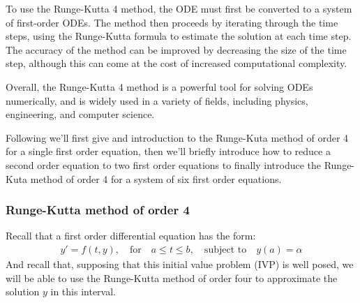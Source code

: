 \documentclass[12pt,twoside]{extarticle}
\begin{document}
To use the Runge-Kutta 4 method, the ODE must first be converted to a system of first-order ODEs. The method then proceeds by iterating through the time steps, using the Runge-Kutta formula to estimate the solution at each time step. The accuracy of the method can be improved by decreasing the size of the time step, although this can come at the cost of increased computational complexity.

Overall, the Runge-Kutta 4 method is a powerful tool for solving ODEs numerically, and is widely used in a variety of fields, including physics, engineering, and computer science.

Following \cite[Chapter 5 Initial-Value Problems for Ordinary Differential Equations, p. 259]{burden} we'll first give and introduction to the Runge-Kuta method of order 4 for a single first order equation, then we'll briefly introduce how to reduce a second order equation to two first order equations to finally introduce the Runge-Kuta method of order 4 for a system of six first order equations.

\subsubsection{Runge-Kutta method of order 4}
    Recall that a first order differential equation has the form:
    \begin{align}
        y'=f(t,y), \quad \text{for} \quad a \leq t \leq b, \quad \text{subject to} \quad y(a)=\alpha
    \end{align}
    And recall that,
    supposing that this initial value problem (IVP) is well posed, we will be able to use the Runge-Kutta method of order four to approximate the solution $y$ in this interval.
    
\end{document}
